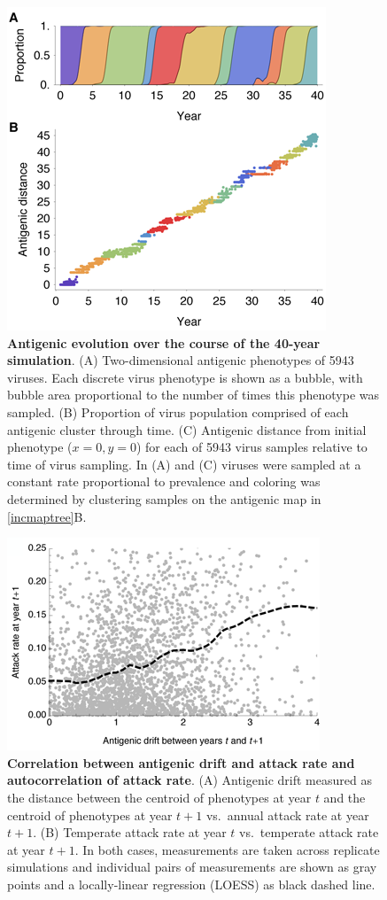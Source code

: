 \pagebreak

\begin{figure}[!c]
	\centering
	\includegraphics{figures/phenotypes}
	\caption{\textbf{Antigenic evolution over the course of the 40-year simulation}. (A) Two-dimensional antigenic phenotypes of 5943 viruses.  Each discrete virus phenotype is shown as a bubble, with bubble area proportional to the number of times this phenotype was sampled. (B) Proportion of virus population comprised of each antigenic cluster through time.  (C) Antigenic distance from initial phenotype ($x=0,y=0$) for each of 5943 virus samples relative to time of virus sampling. In (A) and (C) viruses were sampled at a constant rate proportional to prevalence and coloring was determined by clustering samples on the antigenic map in \ref{incmaptree}B.}
	\label{phenotypes}
\end{figure}

\pagebreak

\begin{figure}[!c]
	\centering
	\includegraphics{figures/driftvsinc}
	\caption{\textbf{Correlation between antigenic drift and attack rate and autocorrelation of attack rate}. (A) Antigenic drift measured as the distance between the centroid of phenotypes at year $t$ and the centroid of phenotypes at year $t+1$ vs.\ annual attack rate at year $t+1$. (B) Temperate attack rate at year $t$ vs.\ temperate attack rate at year $t+1$. In both cases, measurements are taken across replicate simulations and individual pairs of measurements are shown as gray points and a locally-linear regression (LOESS) as black dashed line.}
	\label{driftvsinc}
\end{figure}

